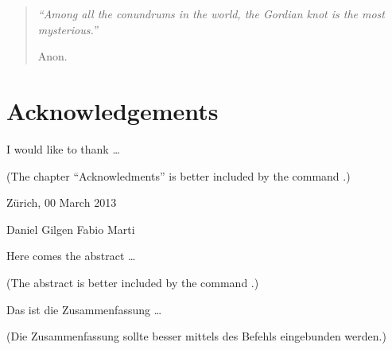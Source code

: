 \documentclass[11pt,a4paper,twoside]{report}
\begin{document}
\vfill
\begin{quote}
  \itshape
  ``Among all the conundrums in the world, the Gordian knot is the most
  mysterious.''

  \hfill Anon.
\end{quote}
\vfill

\cleardoublepage

\chapter*{Acknowledgements}
I would like to thank \ldots

(The chapter ``Acknowledments'' is better included by the command
\verb||.)

\vspace{11mm}
\noindent
Zürich, 00 March 2013

\vspace{19mm}
\noindent
Daniel Gilgen \hfill Fabio Marti \hfill \null
\cleardoublepage

\thispagestyle{empty}
\begin{center} \huge \bfseries \abstractname \end{center}
Here comes the abstract \ldots

(The abstract is better included by the command \verb||.)
\clearpage

\thispagestyle{empty}
\begin{otherlanguage}{ngerman}
  \begin{center} \huge \bfseries \abstractname \end{center}
  Das ist die Zusammenfassung \ldots
  
  (Die Zusammenfassung sollte besser mittels des Befehls \verb||
  eingebunden werden.)
\end{otherlanguage}
\cleardoublepage

\pagestyle{fancy}
\renewcommand{\chaptermark}[1]{\markboth{#1}{}}
\renewcommand{\sectionmark}[1]{\markright{\thesection\ #1}}
\fancyhead{}

\fancyhead[LO]{\scshape \contentsname}
\fancyhead[RE]{\scshape \contentsname}
\tableofcontents
\clearpage

\fancyhead[LO]{\scshape \listfigurename}
\fancyhead[RE]{\scshape \listfigurename}
\listoffigures
\clearpage
\end{document}
